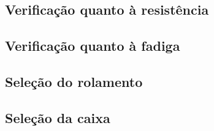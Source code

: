 \subsection{Verificação quanto à resistência}


\subsection{Verificação quanto à fadiga}


\subsection{Seleção do rolamento}


\subsection{Seleção da caixa}

